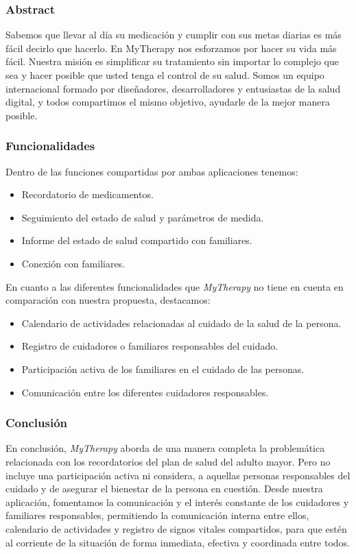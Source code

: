\documentclass[a4paper,12pt]{article}
\begin{document}
    \subsubsection{Abstract}
    \par Sabemos que llevar al día su medicación y cumplir con sus metas diarias es más fácil decirlo que hacerlo. En MyTherapy nos esforzamos por hacer su vida más fácil. Nuestra misión es simplificar su tratamiento sin importar lo complejo que sea y hacer posible que usted tenga el control de su salud. Somos un equipo internacional formado por diseñadores, desarrolladores y entusiastas de la salud digital, y todos compartimos el mismo objetivo, ayudarle de la mejor manera posible. \cite{MyTherapy}
    \subsubsection{Funcionalidades}
    \par Dentro de las funciones compartidas por ambas aplicaciones tenemos:
    \begin{itemize}
        \item Recordatorio de medicamentos.
        \item Seguimiento del estado de salud y parámetros de medida.
        \item Informe del estado de salud compartido con familiares.
        \item Conexión con familiares.
    \end{itemize}
    \par En cuanto a las diferentes funcionalidades que \textit{MyTherapy} no tiene en cuenta en comparación con nuestra propuesta, destacamos:
    \begin{itemize}
        \item Calendario de actividades relacionadas al cuidado de la salud de la persona.
        \item Registro de cuidadores o familiares responsables del cuidado.
        \item Participación activa de los familiares en el cuidado de las personas.
        \item Comunicación entre los diferentes cuidadores responsables.        
    \end{itemize}
    \subsubsection{Conclusión}
    \par En conclusión, \textit{MyTherapy} aborda de una manera completa la problemática relacionada con los recordatorios del plan de salud del adulto mayor. Pero no incluye una participación activa ni considera, a aquellas personas responsables del cuidado y de asegurar el bienestar de la persona en cuestión. Desde nuestra aplicación, fomentamos la comunicación y el interés constante de los cuidadores y familiares responsables, permitiendo la comunicación interna entre ellos, calendario de actividades y registro de signos vitales compartidos, para que estén al corriente de la situación de forma inmediata, efectiva y coordinada entre todos.
\end{document}
